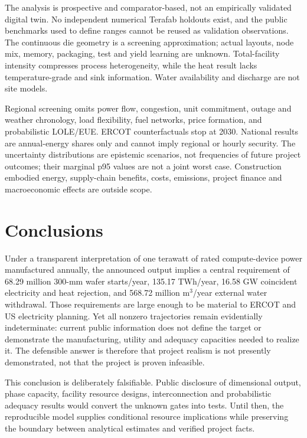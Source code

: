 \documentclass[11pt]{article}
\begin{document}
The analysis is prospective and comparator-based, not an empirically validated
digital twin. No independent numerical Terafab holdouts exist, and the public
benchmarks used to define ranges cannot be reused as validation observations.
The continuous die geometry is a screening approximation; actual layouts,
node mix, memory, packaging, test and yield learning are unknown. Total-facility
intensity compresses process heterogeneity, while the heat result lacks
temperature-grade and sink information. Water availability and discharge are
not site models.

Regional screening omits power flow, congestion, unit commitment, outage and
weather chronology, load flexibility, fuel networks, price formation, and
probabilistic LOLE/EUE. ERCOT counterfactuals stop at 2030. National results are
annual-energy shares only and cannot imply regional or hourly security. The
uncertainty distributions are epistemic scenarios, not frequencies of future
project outcomes; their marginal p95 values are not a joint worst case.
Construction embodied energy, supply-chain benefits, costs, emissions, project
finance and macroeconomic effects are outside scope.

\section{Conclusions}

Under a transparent interpretation of one terawatt of rated compute-device
power manufactured annually, the announced output implies a central
requirement of 68.29 million 300-mm wafer starts/year, 135.17 TWh/year,
16.58 GW coincident electricity and heat rejection, and 568.72 million
m$^3$/year external water withdrawal. Those requirements are large enough to
be material to ERCOT and US electricity planning. Yet all nonzero trajectories
remain evidentially indeterminate: current public information does not define
the target or demonstrate the manufacturing, utility and adequacy capacities
needed to realize it. The defensible answer is therefore that project realism
is not presently demonstrated, not that the project is proven infeasible.

This conclusion is deliberately falsifiable. Public disclosure of dimensional
output, phase capacity, facility resource designs, interconnection and
probabilistic adequacy results would convert the unknown gates into tests. Until
then, the reproducible model supplies conditional resource implications while
preserving the boundary between analytical estimates and verified project
facts.
\end{document}

